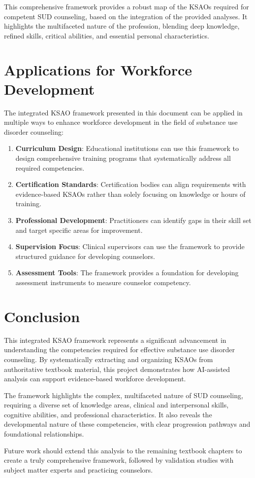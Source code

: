 \documentclass[
  letterpaper,
  DIV=11,
  numbers=noendperiod]{scrartcl}
\begin{document}
This comprehensive framework provides a robust map of the KSAOs required
for competent SUD counseling, based on the integration of the provided
analyses. It highlights the multifaceted nature of the profession,
blending deep knowledge, refined skills, critical abilities, and
essential personal characteristics.

\section{Applications for Workforce
Development}\label{applications-for-workforce-development}

The integrated KSAO framework presented in this document can be applied
in multiple ways to enhance workforce development in the field of
substance use disorder counseling:

\begin{enumerate}
\def\labelenumi{\arabic{enumi}.}
\item
  \textbf{Curriculum Design}: Educational institutions can use this
  framework to design comprehensive training programs that
  systematically address all required competencies.
\item
  \textbf{Certification Standards}: Certification bodies can align
  requirements with evidence-based KSAOs rather than solely focusing on
  knowledge or hours of training.
\item
  \textbf{Professional Development}: Practitioners can identify gaps in
  their skill set and target specific areas for improvement.
\item
  \textbf{Supervision Focus}: Clinical supervisors can use the framework
  to provide structured guidance for developing counselors.
\item
  \textbf{Assessment Tools}: The framework provides a foundation for
  developing assessment instruments to measure counselor competency.
\end{enumerate}

\section{Conclusion}\label{conclusion}

This integrated KSAO framework represents a significant advancement in
understanding the competencies required for effective substance use
disorder counseling. By systematically extracting and organizing KSAOs
from authoritative textbook material, this project demonstrates how
AI-assisted analysis can support evidence-based workforce development.

The framework highlights the complex, multifaceted nature of SUD
counseling, requiring a diverse set of knowledge areas, clinical and
interpersonal skills, cognitive abilities, and professional
characteristics. It also reveals the developmental nature of these
competencies, with clear progression pathways and foundational
relationships.

Future work should extend this analysis to the remaining textbook
chapters to create a truly comprehensive framework, followed by
validation studies with subject matter experts and practicing
counselors.
\end{document}
